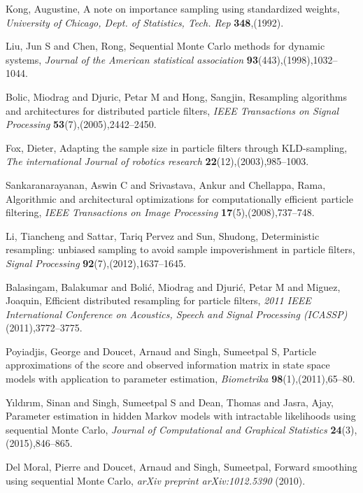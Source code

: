 \documentclass[mstat,12pt]{unswthesis}  %
\numberwithin{equation}{section}
\begin{document}
\begin{thebibliography}{999}
 Kong, Augustine,
A note on importance sampling using standardized weights,
\textit{University of Chicago, Dept. of Statistics, Tech. Rep}
\textbf{348},(1992).


Liu, Jun S and Chen, Rong,
Sequential Monte Carlo methods for dynamic systems,
\textit{Journal of the American statistical association}
\textbf{93}(443),(1998),1032--1044.


 Bolic, Miodrag and Djuric, Petar M and Hong, Sangjin,
Resampling algorithms and architectures for distributed particle filters,
\textit{IEEE Transactions on Signal Processing}
\textbf{53}(7),(2005),2442--2450.

Fox, Dieter,
Adapting the sample size in particle filters through KLD-sampling,
\textit{The international Journal of robotics research}
\textbf{22}(12),(2003),985--1003.


Sankaranarayanan, Aswin C and Srivastava, Ankur and Chellappa, Rama,
Algorithmic and architectural optimizations for computationally efficient particle filtering,
\textit{IEEE Transactions on Image Processing}
\textbf{17}(5),(2008),737--748.
  
 Li, Tiancheng and Sattar, Tariq Pervez and Sun, Shudong,
Deterministic resampling: unbiased sampling to avoid sample impoverishment in particle filters,
\textit{Signal Processing}
\textbf{92}(7),(2012),1637--1645.

Balasingam, Balakumar and Boli{\'c}, Miodrag and Djuri{\'c}, Petar M and Miguez, Joaquin,
Efficient distributed resampling for particle filters,
\textit{2011 IEEE International Conference on Acoustics, Speech and Signal Processing (ICASSP)}
(2011),3772--3775.


Poyiadjis, George and Doucet, Arnaud and Singh, Sumeetpal S,
Particle approximations of the score and observed information matrix in state space models with application to parameter estimation,
\textit{Biometrika}
\textbf{98}(1),(2011),65--80.

Y{\i}ld{\i}r{\i}m, Sinan and Singh, Sumeetpal S and Dean, Thomas and Jasra, Ajay,
Parameter estimation in hidden Markov models with intractable likelihoods using sequential Monte Carlo,
\textit{Journal of Computational and Graphical Statistics}
\textbf{24}(3),(2015),846--865.


Del Moral, Pierre and Doucet, Arnaud and Singh, Sumeetpal,
Forward smoothing using sequential Monte Carlo,
\textit{arXiv preprint arXiv:1012.5390}
(2010).



\end{thebibliography}
\end{document}
